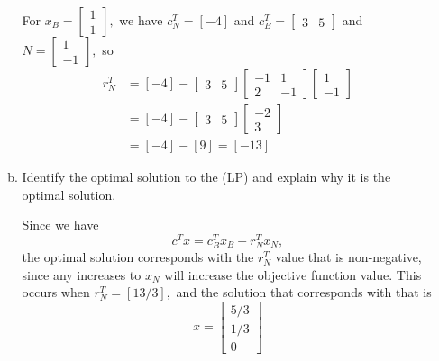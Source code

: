 \documentclass{article}
\begin{document}
\begin{enumerate}
\begin{enumerate}[a)]
\begin{soln}
					For $x_B=\begin{bmatrix}
						1 \\ 1
					\end{bmatrix},$ we have $c_N^T=[-4]$ and $c_B^T=\begin{bmatrix}
						3 & 5
					\end{bmatrix}$ and $N=\begin{bmatrix}
						1 \\ -1
					\end{bmatrix},$ so 
					\begin{align*}
						r_N^T &= [-4] - \begin{bmatrix}
							3 & 5
						\end{bmatrix}\begin{bmatrix}
							-1 & 1 \\
							2 & -1
						\end{bmatrix}\begin{bmatrix}
							1 \\ -1
						\end{bmatrix} \\
						&= [-4] - \begin{bmatrix}
							3 & 5
						\end{bmatrix}\begin{bmatrix}
							-2 \\ 3
						\end{bmatrix} \\
						&= [-4] - [9] = [-13]
					\end{align*}

				\end{soln}

			\item Identify the optimal solution to the (LP) and explain why it is the optimal solution.
				\begin{soln}
					Since we have \[c^T x = c_B^T x_B + r_N^T x_N, \] the optimal solution corresponds with the $r_N^T$ value that is non-negative, since any increases to $x_N$ will increase the objective function value. This occurs when $r_N^T=[13/3],$ and the solution that corresponds with that is \[x=\boxed{\begin{bmatrix}
						5/3 \\ 1/3 \\ 0
				\end{bmatrix}}\]
				\end{soln}
				
		\end{enumerate}


\end{enumerate}
\end{document}
